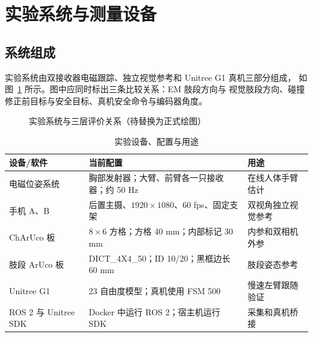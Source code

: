 \section{实验系统与测量设备}
\label{sec:ch6_experimental_setup}

\subsection{系统组成}
\label{subsec:ch6_system_components}

实验系统由双接收器电磁跟踪、独立视觉参考和 Unitree G1 真机三部分组成，
如图~\ref{fig:ch6_evaluation_system} 所示。图中应同时标出三条比较关系：EM 肢段方向与
视觉肢段方向、碰撞修正前目标与安全目标、真机安全命令与编码器角度。

\begin{figure}[htbp]
  \centering
  \caption{实验系统与三层评价关系（待替换为正式绘图）}
  \label{fig:ch6_evaluation_system}
\end{figure}

\begin{table}[htbp]
  \centering
  \caption{实验设备、配置与用途}
  \label{tab:ch6_equipment}
  \begin{tabularx}{\linewidth}{@{}lXX@{}}
    \toprule
    设备/软件 & 当前配置 & 用途 \\
    \midrule
    电磁位姿系统 & 胸部发射器；大臂、前臂各一只接收器；约 50 Hz & 在线人体手臂估计 \\
    手机 A、B & 后置主摄、$1920\times1080$、60 fps、固定支架 & 双视角独立视觉参考 \\
    ChArUco 板 & $8\times6$ 方格；方格 40 mm；内部标记 30 mm & 内参和双相机外参 \\
    肢段 ArUco 板 & DICT\_4X4\_50；ID 10/20；黑框边长 60 mm & 肢段姿态参考 \\
    Unitree G1 & 23 自由度模型；真机使用 FSM 500 & 慢速左臂跟随验证 \\
    ROS 2 与 Unitree SDK & Docker 中运行 ROS 2；宿主机运行 SDK & 采集和真机桥接 \\
    \bottomrule
  \end{tabularx}
\end{table}

